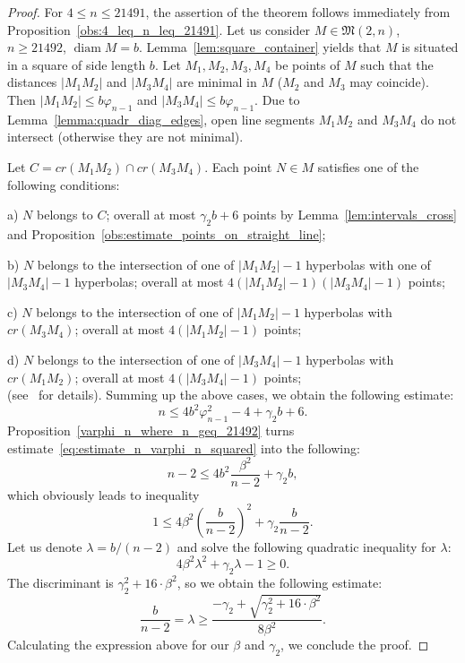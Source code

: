 \documentclass[a4paper,14pt]{article} %
\theoremstyle{plain}
\theoremstyle{definition}
\begin{document}
\begin{proof}
	For $4 \leq n \leq 21491$, the assertion of the theorem follows immediately from Proposition~\ref{obs:4_leq_n_leq_21491}.
	Let us consider $M\in \mathfrak{M}(2,n)$, $n \geq 21492$, $\operatorname{diam} M = b$.
	Lemma~\ref{lem:square_container} yields that $M$ is situated in a square of side length $b$.
	Let $M_1, M_2, M_3, M_4$ be points of $M$ such that the distances $|M_1 M_2|$ and $|M_3 M_4|$
	are minimal in $M$ ($M_2$ and $M_3$ may coincide).
	Then $|M_1 M_2| \leq b\varphi_{n-1}$ and $|M_3 M_4| \leq b\varphi_{n-1}$.
	Due to Lemma~\ref{lemma:quadr_diag_edges}, open line segments $M_1 M_2$ and $M_3 M_4$ do not intersect
	(otherwise they are not minimal).

	Let $C = cr(M_1 M_2) \cap cr(M_3 M_4)$.
	Each point $N\in M$ satisfies one of the following conditions:

	a) $N$ belongs to $C$; overall at most $\gamma_2 b + 6$ points by Lemma~\ref{lem:intervals_cross} and Proposition~\ref{obs:estimate_points_on_straight_line};

	b) $N$ belongs to the intersection of one of $|M_1 M_2| - 1$ hyperbolas
	with one of $|M_3 M_4| - 1$ hyperbolas; overall at most $4 (|M_1 M_2| - 1)(|M_3 M_4| - 1)$ points;

	c) $N$ belongs to the intersection of one of $|M_1 M_2| - 1$ hyperbolas with $cr(M_3 M_4)$;
	overall at most $4 (|M_1 M_2| - 1)$ points;

	d) $N$ belongs to the intersection of one of $|M_3 M_4| - 1$ hyperbolas with $cr(M_1 M_2)$;
	overall at most $4 (|M_3 M_4| - 1)$ points;
	\\
	(see~\cite{erdos1945integral} for details).
	Summing up the above cases, we obtain the following estimate:
	\begin{equation}
		\label{eq:estimate_n_varphi_n_squared}
		n \leq 4 b^2 \varphi_{n-1}^2 - 4 + \gamma_2 b + 6
		.
	\end{equation}
	Proposition~\ref{varphi_n_where_n_geq_21492} turns estimate~\eqref{eq:estimate_n_varphi_n_squared}
	into the following:
	\begin{equation}
		\label{eq:estimate_n_sqrt_n-2}
		n-2 \leq 4 b^2 \frac{\beta^2}{n-2} + \gamma_2 b
		,
	\end{equation}
	which obviously leads to inequality
	\begin{equation}
		1 \leq 4\beta^2 \left(\frac{b}{n-2}\right)^2  + \gamma_2 \frac{b}{n-2}
		.
	\end{equation}
	Let us denote $\lambda = b/(n-2)$ and solve the following quadratic inequality for $\lambda$:
	\begin{equation}
		\label{eq:square_inequality_lambda}
		4\beta^2 \lambda^2  + \gamma_2 \lambda - 1 \geq 0
		.
	\end{equation}
	The discriminant is $\gamma_2^2 + 16 \cdot \beta^2$,
	so we obtain the following estimate:
	\begin{equation}
		\frac{b}{n-2} = \lambda \geq \frac{-\gamma_2 + \sqrt{\gamma_2^2 + 16 \cdot \beta^2}}{8\beta^2}
		.
	\end{equation}
	Calculating the expression above for our $\beta$ and $\gamma_2$, we conclude the proof.
\end{proof}
\end{document}
